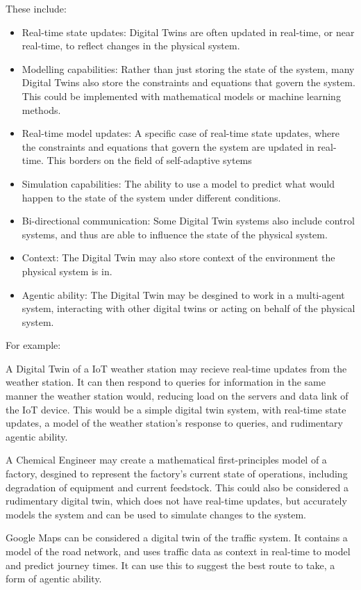 These include:
\begin{itemize}
    \item Real-time state updates: Digital Twins are often updated in real-time, or near real-time, to reflect changes in the physical system. 
    \item Modelling capabilities: Rather than just storing the state of the system, many Digital Twins also store the constraints and equations that govern the system. This could be implemented with mathematical models or machine learning methods.
    \item Real-time model updates: A specific case of real-time state updates, where the constraints and equations that govern the system are updated in real-time. This borders on the field of self-adaptive sytems %
    \item Simulation capabilities: The ability to use a model to predict what would happen to the state of the system under different conditions.
    \item Bi-directional communication: Some Digital Twin systems also include control systems, and thus are able to influence the state of the physical system.
    \item Context: The Digital Twin may also store context of the environment the physical system is in.
    \item Agentic ability: The Digital Twin may be desgined to work in a multi-agent system, interacting with other digital twins or acting on behalf of the physical system.
\end{itemize}


For example:

A Digital Twin of a IoT weather station may recieve real-time updates from the weather station. It can then respond to queries for information in the same manner the weather station would, reducing load on the servers and data link of the IoT device. This would be a simple digital twin system, with real-time state updates, a model of the weather station's response to queries, and rudimentary agentic ability.

A Chemical Engineer may create a mathematical first-principles model of a factory, desgined to represent the factory's current state of operations, including degradation of equipment and current feedstock. This could also be considered a rudimentary digital twin, which does not have real-time updates, but accurately models the system and can be used to simulate changes to the system. 

Google Maps can be considered a digital twin of the traffic system. It contains a model of the road network, and uses traffic data as context in real-time to model and predict journey times. It can use this to suggest the best route to take, a form of agentic ability.

